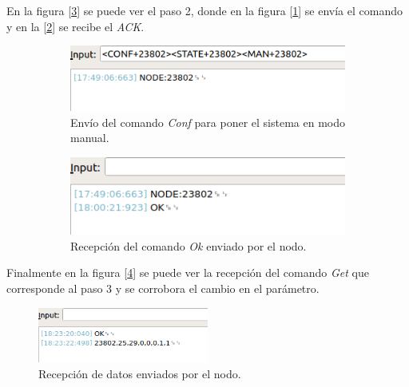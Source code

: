 En la figura [\ref{fig:image2}] se puede ver el paso 2, donde en la figura [\ref{fig:confmanual1}] se envía el comando y en la [\ref{fig:confmanual2}] se recibe el {\textit{ACK}}.

\begin{figure}[h]

\begin{subfigure}{0.5\textwidth}
\includegraphics[width=1\textwidth]{./Figures/CONFMANUAL1.png}
\caption{Envío del comando {\textit{Conf}} para poner el sistema en modo manual.}
\label{fig:confmanual1}
\end{subfigure}
\begin{subfigure}{0.5\textwidth}
\includegraphics[width=1\textwidth]{./Figures/CONFMANUAL2.png}
\caption{Recepción del comando {\textit{Ok}} enviado por el nodo.}
\label{fig:confmanual2}
\end{subfigure}

\caption{}
\label{fig:image2}
\end{figure}

Finalmente en la figura [\ref{fig:confmanual3}] se puede ver la recepción del comando {\textit{Get}} que corresponde al paso 3 y se corrobora el cambio en el parámetro.

\begin{figure}[ht!]
	\centering
	\includegraphics[width=0.5\textwidth]{./Figures/CONFMANUAL3.png}
	\caption{Recepción de datos enviados por el nodo.}
	\label{fig:confmanual3}
\end{figure}


